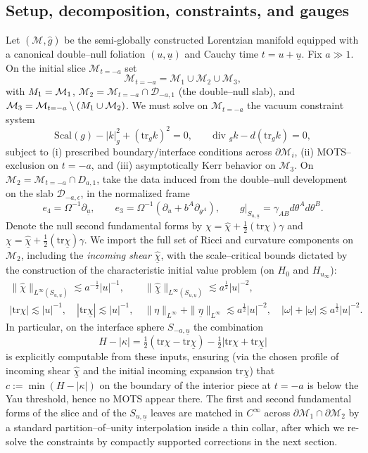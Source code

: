 \documentclass{amsart}
\newcommand{\omegabar}{\underline{\omega}}
\newcommand{\chibar}{\underline{\chi}}
\newcommand{\chibarhat}{\underline{\hat{\chi}}}
\newcommand{\ubar}{\underline{u}}
\newcommand{\etabar}{\underline{\eta}}
\renewcommand{\div}{\mbox{div }}
\newcommand{\tr}{\mbox{tr}}
\begin{document}
{\subsection{Setup, decomposition, constraints, and gauges}
Let $(\mathcal{M},\widehat g)$ be the semi-globally constructed Lorentzian manifold equipped with a canonical double–null foliation $(u,\ubar)$ and Cauchy time $t=u+\ubar$. Fix $a\gg1$. On the initial slice $\mathcal{M}_{t=-a}$ set
\[
\mathcal{M}_{t=-a}=\mathcal{M}_{1}\cup \mathcal M_2\cup \mathcal M_3,
\]
with $\mathcal \mathcal{M}_{1}=\mathcal{M}_{1}$, $\mathcal M_2=\mathcal{M}_{t=-a}\cap\mathcal D_{-a,1}$ (the double–null slab), and $\mathcal M_3=\mathcal{M}_{t=-a}\setminus(\mathcal \mathcal{M}_{1}\cup\mathcal M_2)$. We must solve on $\mathcal{M}_{t=-a}$ the vacuum constraint system
\begin{equation}\label{eq:constraints}
\text{Scal}(g)-|k|_g^2+(\tr_g k)^2=0,\qquad \div_g k - d(\tr_g k)=0,
\end{equation}
subject to (i) prescribed boundary/interface conditions across $\partial\mathcal M_i$, (ii) MOTS–exclusion on $t=-a$, and (iii) asymptotically Kerr behavior on $\mathcal M_3$.
\noindent On $\mathcal M_2=\mathcal{M}_{t=-a}\cap  D_{a,1}$, take the data induced from the double–null development on the slab $\mathcal D_{-a,\epsilon}$, in the normalized frame
\[
e_4=\Omega^{-1}\partial_{\ubar},\qquad e_3=\Omega^{-1}(\partial_u+b^A\partial_{\theta^A}),\qquad g|_{S_{u,\ubar}}=\gamma_{AB}d\theta^A d\theta^B.
\]
Denote the null second fundamental forms by \(\chi=\widehat\chi+\tfrac12(\tr\chi)\gamma\) and \(\chibar=\widehat{\chibar}+\tfrac12(\tr\chibar)\gamma\).
We import the full set of Ricci and curvature components on \(\mathcal M_2\), including the \emph{incoming shear} \(\widehat{\chibar}\), with the scale–critical bounds dictated by the construction of the characteristic initial value problem (on \(H_{0}\) and \(H_{u_\infty}\)):
\begin{align*}
\|\widehat\chi\|_{L^\infty(S_{u,\ubar})}\lesssim a^{-\frac{1}{2}}|u|^{-1},\qquad 
\|\widehat{\chibar}\|_{L^\infty(S_{u,\ubar})}\lesssim a^{\frac{1}{2}}|u|^{-2},\\
|\tr\chi|\lesssim |u|^{-1},\quad |\tr\chibar|\lesssim |u|^{-1},\quad \|\eta\|_{L^\infty}+\|\etabar\|_{L^\infty}\lesssim a^{\frac{1}{2}}|u|^{-2},\quad |\omega|+|\omegabar|\lesssim a^{\frac{1}{2}}|u|^{-2}.
\end{align*}
In particular, on the interface sphere $S_{-a,\ubar}$ the combination
\[
H-|\kappa|=\tfrac12(\tr\chi-\tr\chibar)-\tfrac12\bigl|\tr\chi+\tr\chibar\bigr|
\]
is explicitly computable from these inputs, ensuring (via the chosen profile of incoming shear $\chibarhat$ and the initial incoming expansion $\tr\chibar$) that $c:=\min(H-|\kappa|)$ on the boundary of the interior piece at $t=-a$ is below the Yau threshold, hence no MOTS appear there. The first and second fundamental forms of the slice and of the $S_{u,\ubar}$ leaves are matched in $C^\infty$ across $\partial\mathcal M_{1}\cap\partial\mathcal M_{2}$ by a standard partition–of–unity interpolation inside a thin collar, after which we re-solve the constraints by compactly supported corrections in the next section.



}
\end{document}
